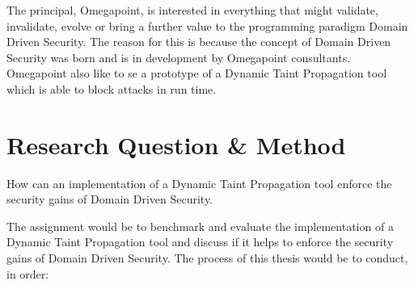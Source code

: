 \documentclass{../kththesis}
\begin{document}
The principal, Omegapoint, is interested in everything that might validate, invalidate, evolve or bring a further value to the programming paradigm Domain Driven Security. The reason for this is because the concept of Domain Driven Security was born and is in development by Omegapoint consultants. Omegapoint also like to se a prototype of a Dynamic Taint Propagation tool which is able to block attacks in run time.



\chapter{Research Question \& Method} \label{ResearchQuestionMethod}
\begin{chapquote}{}
	How can an implementation of a Dynamic Taint Propagation tool enforce the security gains of Domain Driven Security.
\end{chapquote}

\noindent
The assignment would be to benchmark and evaluate the implementation of a Dynamic Taint Propagation tool and discuss if it helps to enforce the security gains of Domain Driven Security. The process of this thesis would be to conduct, in order:
\end{document}
